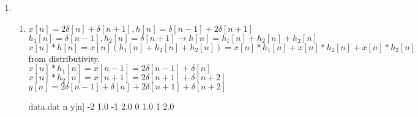 \documentclass[10pt,a4paper, margin=1in]{article}
\begin{document}
\begin{enumerate}
\item %
	\begin{enumerate}
    \item %
    $x[n] = 2\delta[n] + \delta[n+1], h[n] = \delta[n-1] + 2\delta[n+1]$ \vspace{0.1cm} \\
    $h_1[n] = \delta[n-1], h_2[n] = \delta[n+1] \longrightarrow h[n] = h_1[n] + h_2[n] + h_2[n]$ \vspace{0.1cm} \\
    $x[n]*h[n] = x[n](h_1[n] + h_2[n] + h_2[n]) = x[n]*h_1[n]+x[n]*h_2[n]+x[n]*h_2[n]$ from distributivity. \vspace{0.2cm} \\
    $x[n]*h_1[n] = x[n-1] = 2\delta[n-1]+\delta[n]$ \vspace{0.1cm} \\
    $x[n]*h_2[n] = x[n+1] = 2\delta[n+1] + \delta[n+2]$ \vspace{0.1cm} \\
    $y[n] = 2\delta[n-1] + \delta[n] + 2\delta[n+1] + \delta[n+2]$ \vspace{0.2cm} \\

    
    \begin{filecontents}{data.dat}
     n   y[n] 
    -2   1.0
    -1   2.0
     0   1.0  
     1   2.0  
    \end{filecontents}


    \vspace{0.8cm} \\
    

\end{enumerate}
\end{enumerate}
\end{document}
